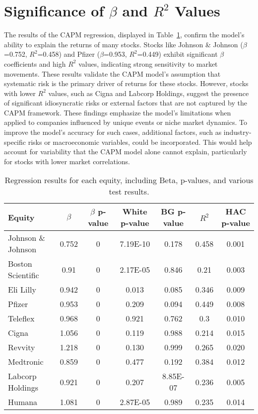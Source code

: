 \section{Significance of $\beta$ and $R^2$ Values}
The results of the CAPM regression, displayed in Table~\ref{tab:equity_results}, confirm the model's ability to explain the 
returns of many stocks. 
Stocks like Johnson \& Johnson ($\beta$=0.752, $R^2$=0.458) and Pfizer ($\beta$=0.953, $R^2$=0.449) exhibit significant
$\beta$ coefficients and high $R^2$ values, indicating strong sensitivity to market movements. 
These results validate the CAPM model's assumption that systematic risk is the primary driver of returns for these stocks.
However, stocks with lower $R^2$ values, such as Cigna and Labcorp Holdings, suggest the presence of significant idiosyncratic 
risks or external factors that are not captured by the CAPM framework.
These findings emphasize the model's limitations when applied to companies influenced by unique events or niche market 
dynamics.
To improve the model's accuracy for such cases, additional factors, such as industry-specific risks or macroeconomic
variables, could be incorporated. 
This would help account for variability that the CAPM model alone cannot explain, particularly for stocks with lower market 
correlations.

\begin{table}
    \centering
    \renewcommand{\arraystretch}{1.2} %
    \footnotesize
    \begin{tabular}{|l|c|c|c|c|c|c|}
        \hline
        \rowcolor{unired!30} \textbf{Equity} & \textbf{$\beta$} & \textbf{$\beta$ p-value} & \textbf{White p-value} & \textbf{BG p-value} & \textbf{$R^2$} & \textbf{HAC p-value} \\ \hline
        Johnson \& Johnson & 0.752 & 0 & 7.19E-10 & 0.178 & 0.458 & 0.001 \\ \hline
        \rowcolor{gray!10} Boston Scientific & 0.91 & 0 & 2.17E-05 & 0.846 & 0.21 & 0.003 \\ \hline
        Eli Lilly & 0.942 & 0 & 0.013 & 0.085 & 0.346 & 0.009 \\ \hline
        \rowcolor{gray!10} Pfizer & 0.953 & 0 & 0.209 & 0.094 & 0.449 & 0.008 \\ \hline
        Teleflex & 0.968 & 0 & 0.921 & 0.762 & 0.3 & 0.010 \\ \hline
        \rowcolor{gray!10} Cigna & 1.056 & 0 & 0.119 & 0.988 & 0.214 & 0.015 \\ \hline
        Revvity & 1.218 & 0 & 0.130 & 0.999 & 0.265 & 0.020 \\ \hline
        \rowcolor{gray!10} Medtronic & 0.859 & 0 & 0.477 & 0.192 & 0.384 & 0.012 \\ \hline
        Labcorp Holdings & 0.921 & 0 & 0.207 & 8.85E-07 & 0.236 & 0.005 \\ \hline
        \rowcolor{gray!10} Humana & 1.081 & 0 & 2.87E-05 & 0.989 & 0.235 & 0.014 \\ \hline
    \end{tabular}
    \caption{Regression results for each equity, including Beta, p-values, and various test results.}
    \label{tab:equity_results}
\end{table}

